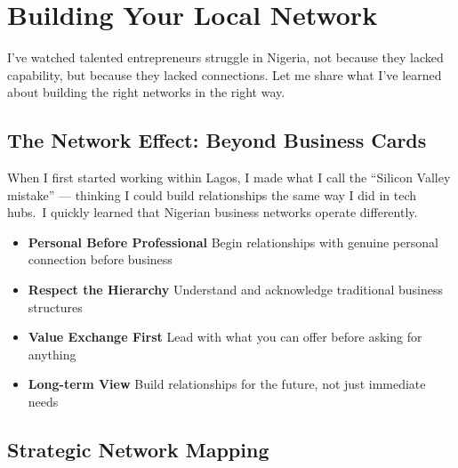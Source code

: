 
\chapter{Building Your Local Network}\label{ch:building-your-local-network}

\begin{importantbox}
I've watched talented entrepreneurs struggle in Nigeria, not because they lacked capability, but because they lacked connections. Let me share what I've learned about building the right networks in the right way.
\end{importantbox}

\section{The Network Effect: Beyond Business Cards}\label{sec:network-effect}

When I first started working within Lagos, I made what I call the ``Silicon Valley mistake'' --- thinking I could build relationships the same way I did in tech hubs.\ I quickly learned that Nigerian business networks operate differently.

\begin{tcolorbox}[colback=white,colframe=primarydark,title=\textbf{Network Building Principles}]
\begin{itemize}
    \item \textbf{Personal Before Professional}
    Begin relationships with genuine personal connection before business

    \item \textbf{Respect the Hierarchy}
    Understand and acknowledge traditional business structures

    \item \textbf{Value Exchange First}
    Lead with what you can offer before asking for anything

    \item \textbf{Long-term View}
    Build relationships for the future, not just immediate needs
\end{itemize}
\end{tcolorbox}

\section{Strategic Network Mapping}\label{sec:strategic-network-mapping}

